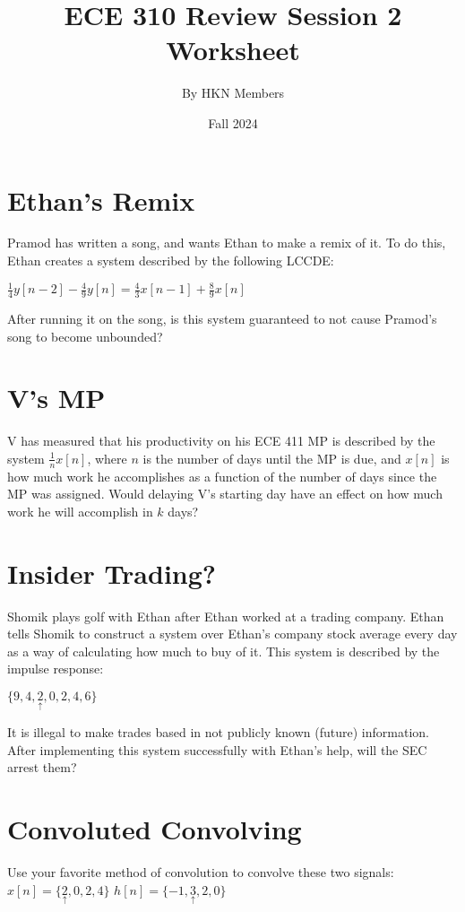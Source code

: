 \documentclass{article}
\title{ECE 310 Review Session 2 Worksheet}
\author{By HKN Members}
\date{Fall 2024}
\begin{document}
\maketitle

\section{Ethan's Remix}
Pramod has written a song, and wants Ethan to make a remix of it. To do this, Ethan creates a system described by the following LCCDE:

$ \frac{1}{4} y[n-2] - \frac{4}{9} y[n] = \frac{4}{3} x[n-1] + \frac{8}{9} x[n]$

After running it on the song, is this system guaranteed to not cause Pramod's song to become unbounded?

\section{V's MP}
V has measured that his productivity on his ECE 411 MP is described by the system $\frac{1}{n} x[n]$, where $n$ is the number of days until the MP is due, and $x[n]$ is how much work he accomplishes as a function of the number of days since the MP was assigned. Would delaying V's starting day have an effect on how much work he will accomplish in $k$ days?

\section{Insider Trading?}

Shomik plays golf with Ethan after Ethan worked at a trading company. Ethan tells Shomik to construct a system over Ethan's company stock average every day as a way of calculating how much to buy of it. This system is described by the impulse response:

\newline

$\{9,4,\underset{\uparrow}{2},0,2,4,6\}$

\newline

It is illegal to make trades based in not publicly known (future) information. After implementing this system successfully with Ethan's help, will the SEC arrest them?

\section{Convoluted Convolving}
Use your favorite method of convolution to convolve these two signals:
\newline
\indent \indent \indent \indent 
$x[n]=\{\underset{\uparrow}{2},0,2,4\}$ \indent \indent $h[n]=\{-1,\underset{\uparrow}{3},2,0\}$
\end{document}
